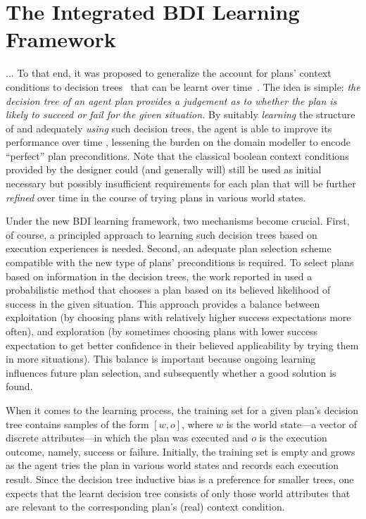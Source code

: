 \section{The Integrated BDI Learning Framework}\label{sec:framework}

... To that end, it was proposed to generalize the account for plans' context conditions to decision trees~\cite{Mitchell97:ML} that can be learnt over time~\cite{airiau09:enhancing,singh10:extending,singh10:learning}. The idea is simple: \emph{the decision tree of an agent plan provides a judgement as to whether the plan is likely to succeed or fail for the given situation.}
By suitably \emph{learning} the structure of and adequately \emph{using} such decision trees, the agent is able to improve its performance over time 
, lessening the burden on
the domain modeller to encode ``perfect'' plan preconditions. Note that the classical boolean context conditions provided by the designer could (and generally will) still be used as initial necessary but possibly insufficient requirements for each plan that will be further \emph{refined} over time in the course of trying plans in various world states.


Under the new BDI learning framework, two mechanisms become crucial. First, of course, a principled approach to learning such decision trees based on execution experiences is needed. Second, an adequate plan selection scheme compatible with the new type of plans' preconditions is required.
To select plans based on information in the decision trees, the work reported in \cite{singh10:extending,singh10:learning} used a probabilistic method that chooses a plan based on its believed likelihood of success in the given situation. This approach provides a balance between exploitation (by choosing plans with relatively higher success expectations more often), and exploration (by sometimes choosing plans with lower success expectation to get better confidence in their believed applicability by trying them in more situations). This balance is important because ongoing learning influences future plan selection, and subsequently whether a good solution is found.

When it comes to the learning process, the training set for a given plan's decision tree contains samples of the form $[w, o]$, where $w$ is the world state---a vector of discrete attributes---in which the plan was executed and $o$ is the execution outcome, namely, success or failure. Initially, the training set is empty and grows as the agent tries the plan in various world states and records each execution result. 
Since the decision tree inductive bias is a preference for smaller trees, one expects that the learnt decision tree consists of only those world attributes that are relevant to the corresponding plan's (real) context condition.

